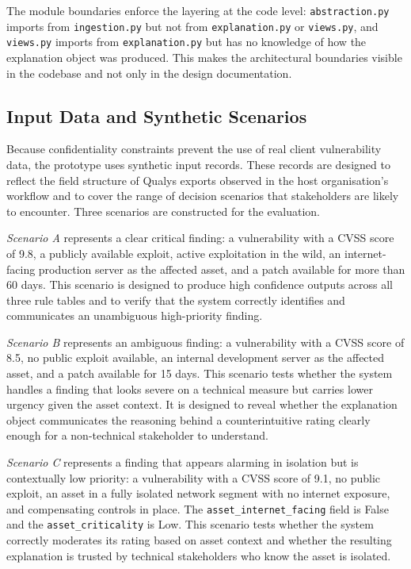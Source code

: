 The module boundaries enforce the layering at the code level: \texttt{abstraction.py} imports from \texttt{ingestion.py} but not from \texttt{explanation.py} or \texttt{views.py}, and \texttt{views.py} imports from \texttt{explanation.py} but has no knowledge of how the explanation object was produced. This makes the architectural boundaries visible in the codebase and not only in the design documentation.

\subsection{Input Data and Synthetic Scenarios}

Because confidentiality constraints prevent the use of real client vulnerability data, the prototype uses synthetic input records. These records are designed to reflect the field structure of Qualys exports observed in the host organisation's workflow and to cover the range of decision scenarios that stakeholders are likely to encounter. Three scenarios are constructed for the evaluation.

\textit{Scenario A} represents a clear critical finding: a vulnerability with a \ac{CVSS} score of 9.8, a publicly available exploit, active exploitation in the wild, an internet-facing production server as the affected asset, and a patch available for more than 60 days. This scenario is designed to produce high confidence outputs across all three rule tables and to verify that the system correctly identifies and communicates an unambiguous high-priority finding.

\textit{Scenario B} represents an ambiguous finding: a vulnerability with a \ac{CVSS} score of 8.5, no public exploit available, an internal development server as the affected asset, and a patch available for 15 days. This scenario tests whether the system handles a finding that looks severe on a technical measure but carries lower urgency given the asset context. It is designed to reveal whether the explanation object communicates the reasoning behind a counterintuitive rating clearly enough for a non-technical stakeholder to understand.

\textit{Scenario C} represents a finding that appears alarming in isolation but is contextually low priority: a vulnerability with a \ac{CVSS} score of 9.1, no public exploit, an asset in a fully isolated network segment with no internet exposure, and compensating controls in place. The \texttt{asset\_internet\_facing} field is False and the \texttt{asset\_criticality} is Low. This scenario tests whether the system correctly moderates its rating based on asset context and whether the resulting explanation is trusted by technical stakeholders who know the asset is isolated.

